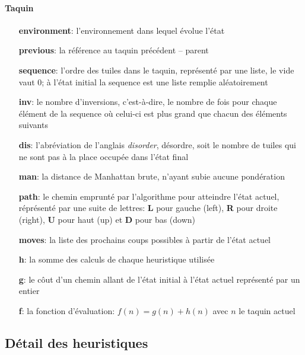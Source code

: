 \documentclass[10pt,a4paper]{report}
\begin{document}
\paragraph{Taquin}
\begin{enumerate}
\item [{\ttfamily\bfseries environment}:] {l'environnement dans lequel évolue l’état}
\item [{\ttfamily\bfseries previous}:] {la référence au taquin précédent – parent}
\item [{\ttfamily\bfseries sequence}:] {l'ordre des tuiles dans le taquin, représenté par une liste, le vide vaut ${0}$; à l'état initial la {\ttfamily sequence} est une liste remplie aléatoirement}
\item [{\ttfamily\bfseries inv}:] {le nombre d'inversions,  c’est-à-dire, le nombre de fois pour chaque élément de la {\ttfamily sequence}  où celui-ci est plus grand que chacun des éléments suivants}
\item [{\ttfamily\bfseries dis}:] {l'abréviation de l'anglais {\em disorder}, désordre, soit le nombre de tuiles qui ne sont pas à la place occupée dans l'état final}
\item [{\ttfamily\bfseries man}:] {la distance de Manhattan brute, n'ayant subie aucune pondération}
\item [{\ttfamily\bfseries path}:] {le chemin emprunté par l'algorithme pour atteindre l'état actuel, réprésenté par une suite de lettres: {\ttfamily\bfseries L} pour gauche (left), {\ttfamily\bfseries R} pour droite (right), {\ttfamily\bfseries U} pour haut (up) et {\ttfamily\bfseries D} pour bas (down)}
\item [{\ttfamily\bfseries moves}:] {la liste des prochains coups possibles à partir de l'état actuel}
\item [{\ttfamily\bfseries h}:] {la somme des calculs de chaque heuristique utilisée}
\item [{\ttfamily\bfseries g}:] {le côut d'un chemin allant de l'état initial à l'état actuel représenté par un entier}
\item [{\ttfamily\bfseries f}:] {la fonction d'évaluation: ${f(n) = g(n) + h(n)}$ avec ${n}$ le taquin actuel}
\end{enumerate}
\subsection{Détail des heuristiques}
\end{document}
